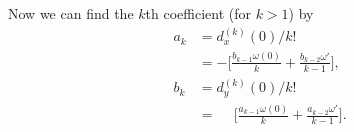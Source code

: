 \documentclass{report}
\begin{document}
Now we can find the $k$th coefficient (for $k > 1$) by
\begin{equation}
    \begin{aligned}
        a_k &= d_x^{(k)}(0)/k! \\
            &= -\Bigg[ \frac{b_{k-1} \omega(0)}{k}  + \frac{b_{k-2} \omega'}{k-1}  \Bigg],\\
        b_k &= d_y^{(k)}(0)/k! \\
            &= \phantom{-} \Bigg[ \frac{a_{k-1} \omega(0)}{k}  + \frac{a_{k-2} \omega'}{k-1}  \Bigg].
    \end{aligned}
\end{equation}
\end{document}
